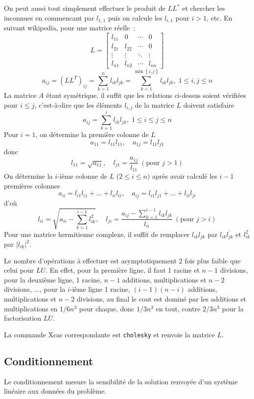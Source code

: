 \documentclass[a4paper,11pt]{article}
\begin{document}
On peut aussi tout simplement effectuer le produit de $L L^*$ et
chercher les inconnues en commencant par $l_{1,1}$ puis on calcule
les $l_{i,1}$ pour $i>1$, etc. En suivant wikipedia, pour une matrice r\'eelle~:
\[ L=\begin{bmatrix}
l_{11}& 0 & \cdots & 0 \\
l_{21} & l_{22}& \cdots & 0\\
\vdots & \vdots & \ddots & \vdots\\
l_{n1} & l_{n2} & \cdots & l_{nn}
\end{bmatrix} \]
\[ a_{ij}=\left(LL^{T}\right)_{ij}={\sum_{k=1}^{n}l_{ik}l_{jk}}=
{\sum_{k=1}^{\min\left\{ i,j\right\} }l_{ik}l_{jk}},\;1\leq i,j\leq n \]
La matrice $A$ étant sym\'etrique, il suffit que les relations ci-dessus
soient v\'erifi\'ees pour $i \leq j$, 
c'est-à-dire que les \'el\'ements $l_{i,j}$ de la matrice $L$ doivent
satisfaire
\[ a_{ij}={\sum_{k=1}^{i}l_{ik}l_{jk}},\;1\leq i\leq j\leq n \]
Pour $i=1$, on d\'etermine la premi\`ere colonne de $L$
\[ a_{11}=l_{11}l_{11}, \quad a_{1j}=l_{11}l_{j1}\]
donc
\[ l_{11}=\sqrt{a_{11}}, \quad l_{j1}=\frac{a_{1j}}{l_{11}}
\ (\mbox{pour } j>1) \]
On d\'etermine la $i$-i\`eme colonne de $L$ ($2\leq i\leq n)$ apr\`es avoir
calculé les $i-1$ premi\`eres colonnes
\[ a_{ii}=l_{i1}l_{i1}+\ldots+l_{ii}l_{ii}, \quad
a_{ij}=l_{i1}l_{j1}+\ldots+l_{ii}l_{ji} \]
d'où 
\[ l_{ii}= \sqrt{{a_{ii}-{\sum_{k=1}^{i-1}l_{ik}^{2}}}}, \quad
l_{ji}=\frac{a_{ij}-{\sum_{k=1}^{i-1}l_{ik}l_{jk}}}{l_{ii}} \
(\mbox{pour } j > i)\]
Pour une matrice hermitienne complexe, il suffit de remplacer
$l_{ik}l_{jk}$ par $l_{ik}\overline{l_{jk}}$ et $l_{ik}^{2}$ par
$|l_{ik}|^{2}$.

Le nombre d'op\'erations \`a effectuer est asymptotiquement
2 fois plus faible que celui pour $LU$. En effet,
pour la premi\`ere ligne, il faut 1 racine et $n-1$ divisions,
pour la deuxi\`eme ligne, 1 racine, $n-1$ additions, multiplications
et $n-2$ divisions, ..., pour la $i$-i\`eme ligne 1 racine,
$(i-1)(n-i)$ additions, multiplications et $n-2$ divisions, au final
le cout est domin\'e par les additions et multiplications en $1/6n^3$
pour chaque, donc $1/3n^3$ en tout, contre $2/3n^3$ pour la
factorisation $LU$.

La commande Xcas correspondante est \verb|cholesky| et renvoie
la matrice $L$.

\subsection{Conditionnement}  
Le conditionnement mesure la sensibilit\'e de la solution renvoy\'ee d'un
syst\`eme lin\'eaire aux donn\'ees du probl\`eme.
\end{document}
